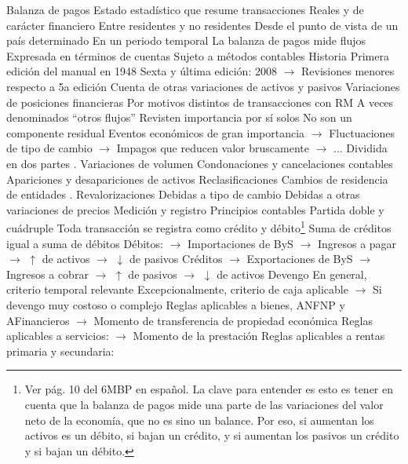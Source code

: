 \documentclass{nuevotema}
\begin{document}
\begin{esquemal}
			\3 Balanza de pagos
				\4 Estado estadístico que resume transacciones
				\4[] Reales y de carácter financiero
				\4 Entre residentes y no residentes
				\4[] Desde el punto de vista de un país determinado
				\4 En un periodo temporal
				\4[] La balanza de pagos mide flujos
				\4 Expresada en términos de cuentas
				\4[] Sujeto a métodos contables
				\4 Historia
				\4[] Primera edición del manual en 1948
				\4[] Sexta y última edición: 2008
				\4[] $\to$ Revisiones menores respecto a 5a edición
			\3 Cuenta de otras variaciones de activos y pasivos
				\4 Variaciones de posiciones financieras
				\4[] Por motivos distintos de transacciones con RM
				\4 A veces denominados ``otros flujos''
				\4 Revisten importancia por sí solos
				\4[] No son un componente residual
				\4[] Eventos económicos de gran importancia
				\4[] $\to$ Fluctuaciones de tipo de cambio
				\4[] $\to$ Impagos que reducen valor bruscamente
				\4[] $\to$ ...
				\4 Dividida en dos partes
				. Variaciones de volumen
				\4[] \quad Condonaciones y cancelaciones contables
				\4[] \quad Apariciones y desapariciones de activos
				\4[] \quad Reclasificaciones
				\4[] \quad Cambios de residencia de entidades
				. Revalorizaciones
				\4[] \quad Debidas a tipo de cambio
				\4[] \quad Debidas a otras variaciones de precios
		\2 Medición y registro
			\3 Principios contables
				\4 Partida doble y cuádruple
				\4[] Toda transacción se registra como crédito y débito\footnote{Ver pág. 10 del 6MBP en español. La clave para entender es esto es tener en cuenta que la balanza de pagos mide una parte de las variaciones del valor neto de la economía, que no es sino un balance. Por eso, si aumentan los activos es un débito, si bajan un crédito, y si aumentan los pasivos un crédito y si bajan un débito. }
				\4[] Suma de créditos igual a suma de débitos
				\4[] Débitos:
				\4[] $\to$ Importaciones de ByS
				\4[] $\to$ Ingresos a pagar
				\4[] $\to$ $\uparrow$ de activos
				\4[] $\to$ $\downarrow$ de pasivos
				\4[] Créditos
				\4[] $\to$ Exportaciones de ByS
				\4[] $\to$ Ingresos a cobrar
				\4[] $\to$ $\uparrow$ de pasivos
				\4[] $\to$ $\downarrow$ de activos
				\4 Devengo
				\4[] En general, criterio temporal relevante
				\4[] Excepcionalmente, criterio de caja aplicable
				\4[] $\to$ Si devengo muy costoso o complejo
				\4[] Reglas aplicables a bienes, ANFNP y AFinancieros
				\4[] $\to$ Momento de transferencia de propiedad económica
				\4[] Reglas aplicables a servicios:
				\4[] $\to$ Momento de la prestación
				\4[] Reglas aplicables a rentas primaria y secundaria:

\end{esquemal}
\end{document}
